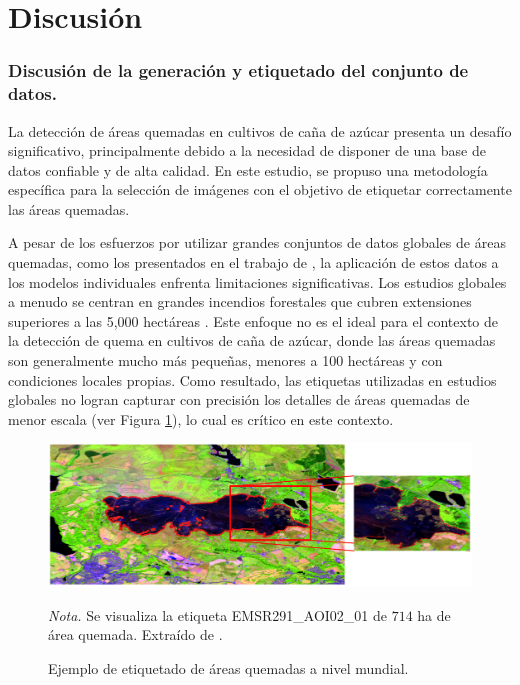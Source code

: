 \section{Discusión}
\subsubsection{Discusión de la generación y etiquetado del conjunto de datos.}
\label{sec:discusion}
La detección de áreas quemadas en cultivos de caña de azúcar presenta un desafío significativo, principalmente debido a la necesidad de 
disponer de una base de datos confiable y de alta calidad. En este estudio, se propuso una metodología específica para la selección de 
imágenes con el objetivo de etiquetar correctamente las áreas quemadas. 

A pesar de los esfuerzos por utilizar grandes conjuntos de datos globales de áreas quemadas, como los presentados en el trabajo de \citet{arnaudo_robust_2023}, 
la aplicación de estos datos a los modelos individuales enfrenta limitaciones significativas. Los estudios globales a menudo se centran en grandes incendios forestales 
que cubren extensiones superiores a las 5,000 hectáreas \citet{seydi_burnt-net_2022}. Este enfoque no es el ideal para el contexto de 
la detección de quema en cultivos de caña de azúcar, donde las áreas quemadas son generalmente mucho más pequeñas, menores a 100 hectáreas y con condiciones locales propias. 
Como resultado, las etiquetas utilizadas en estudios globales no logran capturar con precisión los detalles de áreas quemadas de menor escala (ver Figura \ref{fig:db}), lo cual es crítico en este 
contexto.

\begin{figure}[H]
    \centering    
    \caption{Ejemplo de etiquetado de áreas quemadas a nivel mundial.}
    \includegraphics[width=1\textwidth]{img/8_capitulo6/basedatos.png}
    \label{fig:db}
    \begin{flushleft}
        \vspace{-\baselineskip}
        \textit{Nota.} Se visualiza la etiqueta EMSR291\_AOI02\_01 de $714$ ha de área quemada. Extraído de \citet{arnaudo_robust_2023}.      
        \vspace{-\baselineskip}
    \end{flushleft}        
\end{figure}

